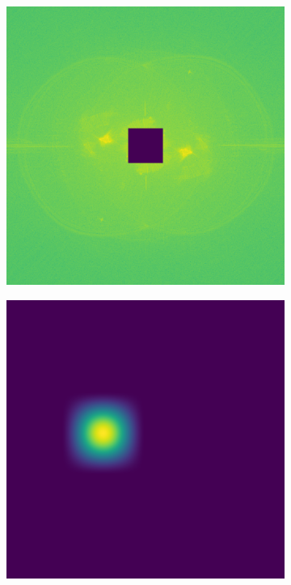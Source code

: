 \begin{figure}
	\begin{subfigure}{0.23\textwidth}
		\centering
		\includegraphics[width=1\linewidth, scale=0.5]{images/puw_new_fringe_fft_centre_blocked.png}
		\caption{}
		\label{fig:puw_new_fringe_fft_centre_blocked}
	\end{subfigure}
	\begin{subfigure}{0.23\textwidth}
		\centering
		\includegraphics[width=1\linewidth, scale=0.5]{images/puw_fft_filter.png}

\end{subfigure}
\end{figure}

